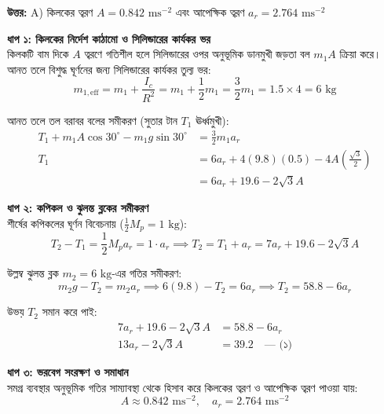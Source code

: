\documentclass[12pt, a4paper]{article}
\begin{document}
\vspace{0.5em}
\begin{tcolorbox}[answerbox]
    \textbf{\color{success} উত্তর:} A) কিলকের ত্বরণ $A = 0.842\text{ ms}^{-2}$ এবং আপেক্ষিক ত্বরণ $a_r = 2.764\text{ ms}^{-2}$
\end{tcolorbox}
\vspace{1em}

\begin{tcolorbox}[solutionbox={সমাধান (Solution)}]
    \noindent
    \textbf{ধাপ ১: কিলকের নির্দেশ কাঠামো ও সিলিন্ডারের কার্যকর ভর} \\
    কিলকটি বাম দিকে $A$ ত্বরণে গতিশীল হলে সিলিন্ডারের ওপর অনুভূমিক ডানমুখী জড়তা বল $m_1 A$ ক্রিয়া করে। 
    আনত তলে বিশুদ্ধ ঘূর্ণনের জন্য সিলিন্ডারের কার্যকর তুল্য ভর:
    \[ m_{1, \text{eff}} = m_1 + \frac{I_c}{R^2} = m_1 + \frac{1}{2} m_1 = \frac{3}{2} m_1 = 1.5 \times 4 = 6\text{ kg} \]
    
    আনত তলে তল বরাবর বলের সমীকরণ (সুতার টান $T_1$ ঊর্ধ্বমুখী):
    \begin{align*}
        T_1 + m_1 A \cos 30^\circ - m_1 g \sin 30^\circ &= \frac{3}{2} m_1 a_r \\
        T_1 &= 6 a_r + 4(9.8)(0.5) - 4 A \left(\frac{\sqrt{3}}{2}\right) \\
        &= 6 a_r + 19.6 - 2\sqrt{3} A
    \end{align*}
    
    \vspace{0.5em}
    \noindent\textbf{ধাপ ২: কপিকল ও ঝুলন্ত ব্লকের সমীকরণ} \\
    শীর্ষের কপিকলের ঘূর্ণন বিবেচনায় ($\frac{1}{2} M_p = 1\text{ kg}$):
    \[ T_2 - T_1 = \frac{1}{2} M_p a_r = 1 \cdot a_r \implies T_2 = T_1 + a_r = 7 a_r + 19.6 - 2\sqrt{3} A \]
    
    উল্লম্ব ঝুলন্ত ব্লক $m_2 = 6\text{ kg}$-এর গতির সমীকরণ:
    \[ m_2 g - T_2 = m_2 a_r \implies 6(9.8) - T_2 = 6 a_r \implies T_2 = 58.8 - 6 a_r \]
    
    উভয় $T_2$ সমান করে পাই:
    \begin{align*}
        7 a_r + 19.6 - 2\sqrt{3} A &= 58.8 - 6 a_r \\
        13 a_r - 2\sqrt{3} A &= 39.2 \quad \text{--- (১)}
    \end{align*}
    
    \vspace{0.5em}
    \noindent\textbf{ধাপ ৩: ভরবেগ সংরক্ষণ ও সমাধান} \\
    সমগ্র ব্যবস্থার অনুভূমিক গতির সাম্যাবস্থা থেকে হিসাব করে কিলকের ত্বরণ ও আপেক্ষিক ত্বরণ পাওয়া যায়:
    \[ A \approx \mathbf{0.842}\text{ ms}^{-2}, \quad a_r = \mathbf{2.764}\text{ ms}^{-2} \]
\end{tcolorbox}
\end{document}
